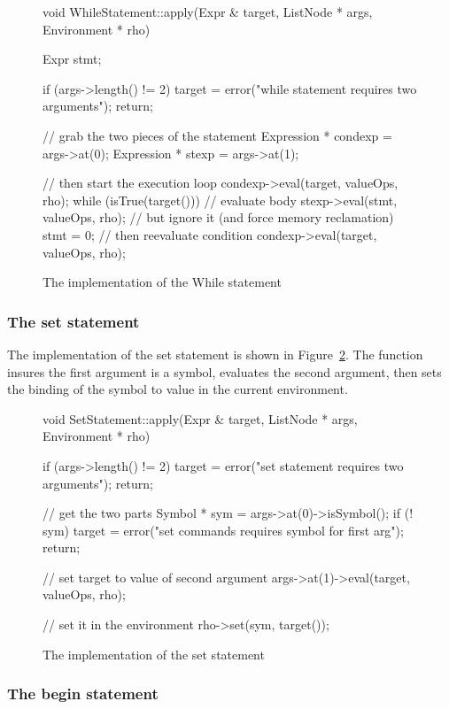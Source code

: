 \begin{figure}
\begin{cprog}
void WhileStatement::apply(Expr & target, ListNode * args, Environment * rho)
{	Expr stmt;

	if (args->length() != 2) {
		target = error("while statement requires two arguments");
		return;
		}

	// grab the two pieces of the statement
	Expression * condexp = args->at(0);
	Expression * stexp = args->at(1);

	// then start the execution loop
	condexp->eval(target, valueOps, rho);
	while (isTrue(target())) {
		// evaluate body
		stexp->eval(stmt, valueOps, rho);
		// but ignore it (and force memory reclamation)
		stmt = 0;
		// then reevaluate condition
		condexp->eval(target, valueOps, rho);
		}
}
\end{cprog}
\caption{The implementation of the While statement}\label{whilestmt}
\end{figure}

\subsubsection{The set statement}

The implementation of the set statement is shown in
Figure~\ref{setstatement}.  The function insures the first argument is a
symbol, evaluates the second argument, then sets the binding of the symbol
to value in the current environment.

\begin{figure}
\begin{cprog}
void SetStatement::apply(Expr & target, ListNode * args, Environment * rho)
{
	if (args->length() != 2) {
		target = error("set statement requires two arguments");
		return;
		}

	// get the two parts
	Symbol * sym = args->at(0)->isSymbol();
	if (! sym) {
		target = error("set commands requires symbol for first arg");
		return;
		}

	// set target to value of second argument
	args->at(1)->eval(target, valueOps, rho);

	// set it in the environment
	rho->set(sym, target());
}
\end{cprog}
\caption{The implementation of the set statement}\label{setstatement}
\end{figure}

\subsubsection{The begin statement}

